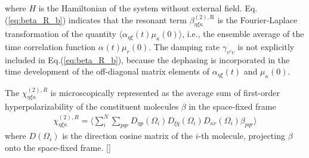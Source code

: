 where $H$ is the Hamiltonian of the system without external field. 
Eq.\thinspace(\ref{eq:beta_R_b}) indicates that the resonant term $\beta_{\eta\xi\kappa}^{(2),\text{R}}$ is the Fourier-Laplace transformation of the quantity $\langle\alpha_{\eta\xi}(t)\mu_{\kappa}(0)\rangle$, i.e., the ensemble average of the time correlation function $\alpha_{}(t)\mu_{r}(0)$.
The damping rate $\gamma_{v'v}$ is not explicitly included in Eq.\thinspace(\ref{eq:beta_R_b}), because the dephasing is incorporated in the time development of the off-diagonal matrix elements 
of $\alpha_{\eta\xi}(t)$ and $\mu_{\kappa}(0)$.

The $\chi^{(2),R}_{\eta\xi\kappa}$ is microscopically represented as the average sum of first-order hyperpolarizability of the constituent molecules $\beta$ in the space-fixed frame
\begin{align}
  \chi^{(2),R}_{\eta\xi\kappa} = \langle \sum_i^N \sum_{pqr} D_{\eta p}(\Omega_i) D_{\xi q}(\Omega_i) D_{\kappa r}(\Omega_i) \beta_{pqr}\rangle
\label{average_sum}
\end{align}
where $D(\Omega_i)$ is the direction cosine matrix of the $i$-th molecule, projecting $\beta$ onto the space-fixed frame. [\cite{Morita2000}]


